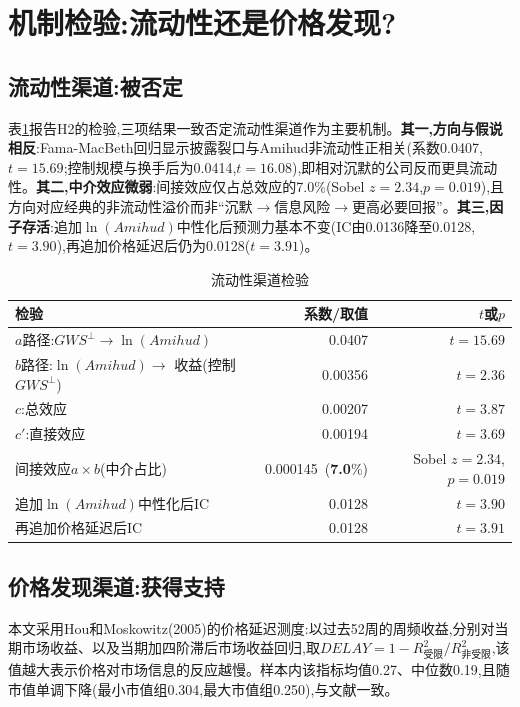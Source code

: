 \documentclass[UTF8, a4paper, fontset=fandol, zihao=-4]{ctexart}
\begin{document}
\section{机制检验:流动性还是价格发现?}

\subsection{流动性渠道:被否定}

表\ref{tab:liq}报告H2的检验,三项结果一致否定流动性渠道作为主要机制。\textbf{其一,方向与假说相反}:Fama-MacBeth回归显示披露裂口与Amihud非流动性正相关(系数0.0407,$t=15.69$;控制规模与换手后为0.0414,$t=16.08$),即相对沉默的公司反而更具流动性。\textbf{其二,中介效应微弱}:间接效应仅占总效应的7.0\%(Sobel $z=2.34$,$p=0.019$),且方向对应经典的非流动性溢价而非“沉默$\to$信息风险$\to$更高必要回报”。\textbf{其三,因子存活}:追加$\ln(Amihud)$中性化后预测力基本不变(IC由0.0136降至0.0128,$t=3.90$),再追加价格延迟后仍为0.0128($t=3.91$)。

\begin{table}[H]
\centering
\begin{threeparttable}
\caption{流动性渠道检验}\label{tab:liq}
\begin{tabular}{lrr}
\toprule
检验 & 系数/取值 & $t$或$p$ \\
\midrule
$a$路径:$GWS^{\perp}\to \ln(Amihud)$ & 0.0407 & $t=15.69$ \\
$b$路径:$\ln(Amihud)\to$ 收益(控制$GWS^{\perp}$) & 0.00356 & $t=2.36$ \\
$c$:总效应 & 0.00207 & $t=3.87$ \\
$c'$:直接效应 & 0.00194 & $t=3.69$ \\
间接效应$a\times b$(中介占比) & 0.000145\ (\textbf{7.0}\%) & Sobel $z=2.34$,$p=0.019$ \\
\midrule
追加$\ln(Amihud)$中性化后IC & 0.0128 & $t=3.90$ \\
再追加价格延迟后IC & 0.0128 & $t=3.91$ \\
\bottomrule
\end{tabular}
\end{threeparttable}
\end{table}

\subsection{价格发现渠道:获得支持}

本文采用Hou和Moskowitz(2005)的价格延迟测度:以过去52周的周频收益,分别对当期市场收益、以及当期加四阶滞后市场收益回归,取$DELAY=1-R^2_{\text{受限}}/R^2_{\text{非受限}}$,该值越大表示价格对市场信息的反应越慢。样本内该指标均值0.27、中位数0.19,且随市值单调下降(最小市值组0.304,最大市值组0.250),与文献一致。
\end{document}
